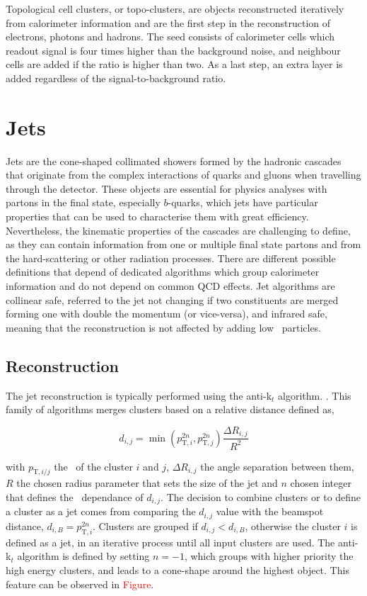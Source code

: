Topological cell clusters, or topo-clusters, are objects reconstructed iteratively from calorimeter information and are the first step in the reconstruction of electrons, photons and hadrons. The seed consists of calorimeter cells which readout signal is four times higher than the background noise, and neighbour cells are added if the ratio is higher than two. As a last step, an extra layer is added regardless of the signal-to-background ratio. 

\section{Jets}

Jets are the cone-shaped collimated showers formed by the hadronic cascades that originate from the complex interactions of quarks and gluons when travelling through the detector. These objects are essential for physics analyses with partons in the final state, especially $b$-quarks, which jets have particular properties that can be used to characterise them with great efficiency. Nevertheless, the kinematic properties of the cascades are challenging to define, as they can contain information from one or multiple final state partons and from the hard-scattering or other radiation processes. There are different possible definitions that depend of dedicated algorithms which group calorimeter information and do not depend on common \acrshort{QCD} effects. Jet algorithms are collinear safe, referred to the jet not changing if two constituents are merged forming one with double the momentum (or vice-versa), and infrared safe, meaning that the reconstruction is not affected by adding low \pT\ particles.

\subsection{Reconstruction}

The jet reconstruction is typically performed using the anti-k$_t$ algorithm. %
. This family of algorithms merges clusters based on a relative distance defined as,

\begin{equation}
    d_{i,j} = \min (p_{\text{T},i}^{2n},p_{\text{T},j}^{2n}) \frac{\Delta R_{i,j}}{R^2}
\end{equation}

with $p_{\text{T},i/j}$ the \pT\ of the cluster $i$ and $j$, $\Delta R_{i,j}$ the angle separation between them, $R$ the chosen radius parameter that sets the size of the jet and $n$ chosen integer that defines the \pT\ dependance of $d_{i,j}$. The decision to combine clusters or to define a cluster as a jet comes from comparing the $d_{i,j}$ value with the beamspot distance, $d_{i,B} = p_{\text{T},i}^{2n}$. Clusters are grouped if $d_{i,j} < d_{i,B}$, otherwise the cluster $i$ is defined as a jet, in an iterative process until all input clusters are used. The anti-k$_t$ algorithm is defined by setting $n=-1$, which groups with higher priority the high energy clusters, and leads to a cone-shape around the highest object. This feature can be observed in \textcolor{red}{Figure}.

